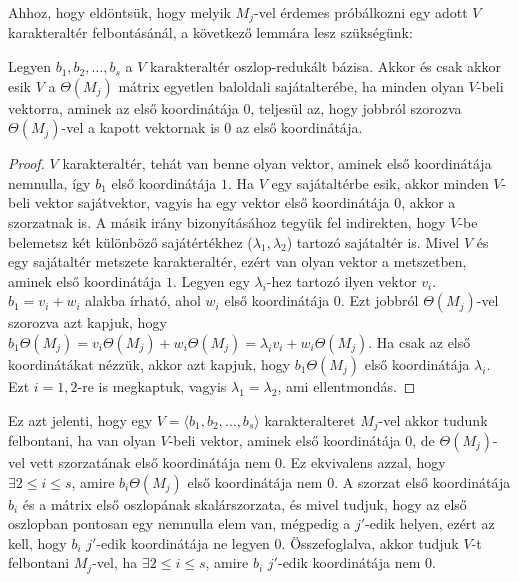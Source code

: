 Ahhoz, hogy eldöntsük, hogy melyik $M_j$-vel érdemes próbálkozni egy adott $V$ karakteraltér felbontásánál, a következő lemmára lesz szükségünk:
\begin{lemma}
\label{thm:bdsmjfix}
Legyen $b_1,b_2,\dots,b_s$ a $V$ karakteraltér oszlop-redukált bázisa.
Akkor és csak akkor esik $V$ a $\Theta(M_j)$ mátrix egyetlen baloldali sajátalterébe, ha minden olyan $V$-beli vektorra, aminek az első koordinátája $0$, teljesül az,
hogy jobbról szorozva $\Theta(M_j)$-vel a kapott vektornak is $0$ az első koordinátája.
\end{lemma}
\begin{proof}
$V$ karakteraltér, tehát van benne olyan vektor, aminek első koordinátája nemnulla, így $b_1$ első koordinátája $1$.
Ha $V$ egy sajátaltérbe esik, akkor minden $V$-beli vektor sajátvektor, vagyis ha egy vektor első koordinátája $0$, akkor a szorzatnak is.
A másik irány bizonyításához tegyük fel indirekten, hogy $V$-be belemetsz két különböző sajátértékhez ($\lambda_1, \lambda_2$) tartozó sajátaltér is.
Mivel $V$ és egy sajátaltér metszete karakteraltér, ezért van olyan vektor a metszetben, aminek első koordinátája $1$. Legyen egy $\lambda_i$-hez tartozó ilyen vektor $v_i$.
$b_1=v_i+w_i$ alakba írható, ahol $w_i$ első koordinátája $0$. Ezt jobbról $\Theta(M_j)$-vel szorozva azt kapjuk, hogy
$b_1\Theta(M_j)=v_i\Theta(M_j)+w_i\Theta(M_j)=\lambda_i v_i+w_i\Theta(M_j)$. Ha csak az első koordinátákat nézzük, akkor azt kapjuk, hogy $b_1\Theta(M_j)$ első koordinátája $\lambda_i$.
Ezt $i=1,2$-re is megkaptuk, vagyis $\lambda_1=\lambda_2$, ami ellentmondás.
\end{proof}
Ez azt jelenti, hogy egy $V=\langle b_1, b_2, \dots, b_s \rangle$ karakteralteret $M_j$-vel akkor tudunk felbontani, ha van olyan $V$-beli vektor,
aminek első koordinátája $0$, de $\Theta(M_j)$-vel vett szorzatának első koordinátája nem $0$.
Ez ekvivalens azzal, hogy $\exists 2\le i\le s$, amire $b_i \Theta(M_j)$ első koordinátája nem $0$.
A szorzat első koordinátája $b_i$ és a mátrix első oszlopának skalárszorzata, és mivel tudjuk, hogy az első oszlopban pontosan egy nemnulla elem van, mégpedig a $j'$-edik helyen,
ezért az kell, hogy $b_i$ $j'$-edik koordinátája ne legyen $0$.
Összefoglalva, akkor tudjuk $V$-t felbontani $M_j$-vel, ha $\exists 2\le i\le s$, amire $b_i$ $j'$-edik koordinátája nem $0$.

